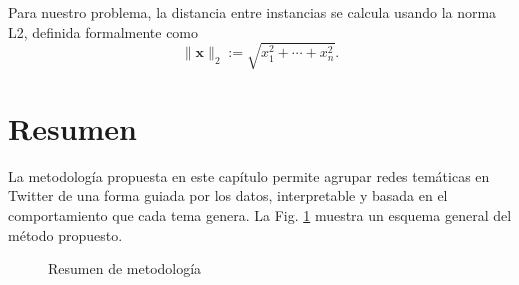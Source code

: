 



Para nuestro problema, la distancia entre instancias se calcula usando la norma L2, definida formalmente como
$${\displaystyle \|{\boldsymbol {x}}\|_{2}:={\sqrt {x_{1}^{2}+\cdots +x_{n}^{2}}}.}$$

\section{Resumen}
La metodología propuesta en este capítulo permite agrupar redes temáticas en Twitter de una forma guiada por los datos, interpretable y basada en el comportamiento que cada tema genera. La Fig. \ref{fig:masterplan} muestra un esquema general del método propuesto. 
 
\begin{figure}[htbp]
   \centering
   
    \caption{Resumen de metodología}
    \label{fig:masterplan}
\end{figure}




